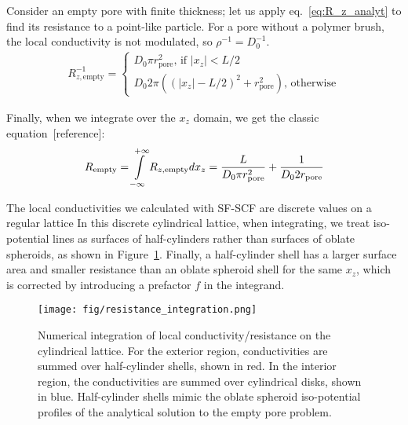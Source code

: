 \documentclass[10pt, a4paper]{article}
\begin{document}
\begin{multicols}{2}
Consider an empty pore with finite thickness; let us apply eq.~\ref{eq:R_z_analyt} to find its resistance to a point-like particle.
For a pore without a polymer brush, the local conductivity is not modulated, so $\rho^{-1} = D_0^{-1}$.
\begin{gather}
    \label{eq:r_z_empty}
    R_{z, \textrm{empty}}^{-1} = 
    \begin{cases}
        D_0 \pi r_{\textrm{pore}}^2 \textrm{, if } |x_z| < L/2
        \\
        D_0 2 \pi \left((|x_z|-L/2)^2 + r_{\textrm{pore}}^2\right) \textrm{, otherwise} 
    \end{cases}
\end{gather}

Finally, when we integrate over the $x_z$ domain, we get the classic equation~[reference]:
\begin{equation}
    \label{eq:r_empty}
    R_{\textrm{empty}} = \int\displaylimits_{-\infty}^{+\infty} R_{z, \textrm{empty}} dx_z
    =\frac{L}{D_0 \pi r_{\textrm{pore}}^2} + \frac{1}{D_0 2 r_{\textrm{pore}}}
\end{equation}

The local conductivities we calculated with SF-SCF are discrete values on a regular lattice
In this discrete cylindrical lattice, when integrating, we treat iso-potential lines as surfaces of half-cylinders rather than surfaces of oblate spheroids, as shown in Figure~\ref{fig:integration_scheme}.
Finally, a half-cylinder shell has a larger surface area and smaller resistance than an oblate spheroid shell for the same $x_z$, which is corrected by introducing a prefactor $f$ in the integrand.

\begin{figure}[H]
    \centering
    \texttt{[image: fig/resistance\_integration.png]}
    \caption{
        Numerical integration of local conductivity/resistance on the cylindrical lattice.
        For the exterior region, conductivities are summed over half-cylinder shells, shown in red.
        In the interior region, the conductivities are summed over cylindrical disks, shown in blue.
        Half-cylinder shells mimic the oblate spheroid iso-potential profiles of the analytical solution to the empty pore problem.
        }
    \label{fig:integration_scheme}
\end{figure}


\end{multicols}
\end{document}
